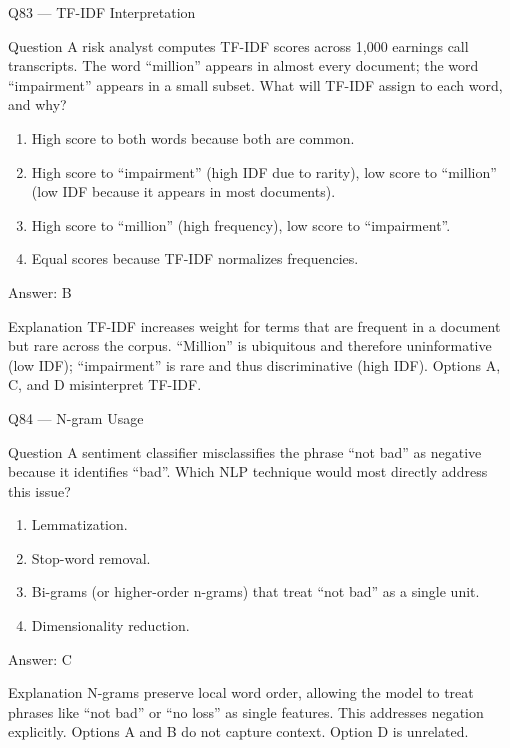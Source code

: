 \documentclass[aspectratio=169,8pt]{beamer}
\begin{document}
\begin{frame}{Q83 --- TF-IDF Interpretation}
\begin{block}{Question}
A risk analyst computes TF-IDF scores across 1,000 earnings call transcripts. The word ``million'' appears in almost every document; the word ``impairment'' appears in a small subset. What will TF-IDF assign to each word, and why?
\end{block}
\begin{enumerate}
\item High score to both words because both are common.
\item High score to ``impairment'' (high IDF due to rarity), low score to ``million'' (low IDF because it appears in most documents).
\item High score to ``million'' (high frequency), low score to ``impairment''.
\item Equal scores because TF-IDF normalizes frequencies.
\end{enumerate}
\begin{exampleblock}{Answer: B}\end{exampleblock}
\begin{block}{Explanation}
TF-IDF increases weight for terms that are frequent in a document but rare across the corpus. ``Million'' is ubiquitous and therefore uninformative (low IDF); ``impairment'' is rare and thus discriminative (high IDF). Options A, C, and D misinterpret TF-IDF.
\end{block}
\end{frame}

\begin{frame}{Q84 --- N-gram Usage}
\begin{block}{Question}
A sentiment classifier misclassifies the phrase ``not bad'' as negative because it identifies ``bad''. Which NLP technique would most directly address this issue?
\end{block}
\begin{enumerate}
\item Lemmatization.
\item Stop-word removal.
\item Bi-grams (or higher-order n-grams) that treat ``not bad'' as a single unit.
\item Dimensionality reduction.
\end{enumerate}
\begin{exampleblock}{Answer: C}\end{exampleblock}
\begin{block}{Explanation}
N-grams preserve local word order, allowing the model to treat phrases like ``not bad'' or ``no loss'' as single features. This addresses negation explicitly. Options A and B do not capture context. Option D is unrelated.
\end{block}
\end{frame}
\end{document}
